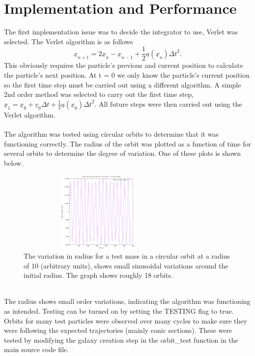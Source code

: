 \documentclass[10pt,a4paper]{article}
\begin{document}
\section{Implementation and Performance}
The first implementation issue was to decide the integrator to use, Verlet was selected. The Verlet algorithm is as follows 
\begin{equation}
	\underline{x}_{n+1} = 2 \underline{x}_n - \underline{x}_{n-1} + \frac{1}{2}  \underline{a}(\underline{x}_n) {\Delta t }^ 2 .
\end{equation}  
This obviously requires the particle's previous and current position to calculate the particle's next position. At t = 0 we only know the particle's current position so the first time step must be carried out using a different algorithm. A simple 2nd order method was selected to carry out the first time step, $\underline{x}_{1} =  \underline{x}_0 + \underline{v}_0 {\Delta t} + \frac{1}{2}  \underline{a}(\underline{x}_0) {\Delta t }^ 2 .$ All future steps were then carried out using the Verlet algorithm.
\\
\\
The algorithm was tested using circular orbits to determine that it was functioning correctly. The radius of the orbit was plotted as a function of time for several orbits to determine the degree of variation. One of these plots is shown below.
\begin{figure}[ht!]
\centering
\includegraphics[width=80mm, height=40mm]{../output/Radius.png}
\caption{The variation in radius for a test mass in a circular orbit at a radius of 10 (arbitrary units), shows small sinusoidal variations around the initial radius. The graph shows roughly 18 orbits.
\label{radiusfig}}
\end{figure}
\\
The radius shows small order variations, indicating the algorithm was functioning as intended. Testing can be turned on by setting the TESTING flag to true. Orbits for many test particles were observed over many cycles to make sure they were following the expected trajectories (mainly conic sections). These were tested by modifying the galaxy creation step in the orbit\_test function in the main source code file.
\end{document}
